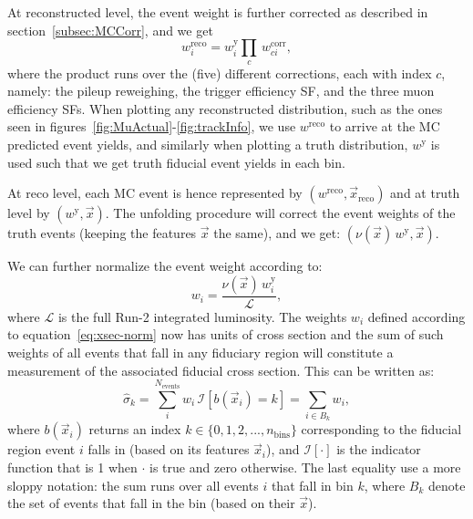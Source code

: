 At reconstructed level, the event weight is further corrected as described in section~\ref{subsec:MCCorr}, and we get
\begin{equation}
  \label{eq:mc-norm-reco}
  w^\mathrm{reco}_i = w^\mathrm{y}_i \prod_c\,w^\mathrm{corr}_{ci},
\end{equation} 
where the product runs over the (five) different corrections, each with index $c$, namely: the pileup reweighing, the trigger efficiency SF, and the three muon efficiency SFs. When plotting any reconstructed distribution, such as the ones seen in figures~\ref{fig:MuActual}-\ref{fig:trackInfo}, we use $w^\mathrm{reco}$ to arrive at the MC predicted event yields, and similarly when plotting a truth distribution, $w^\mathrm{y}$ is used such that we get truth fiducial event yields in each bin.


At reco level, each MC event is hence represented by $(w^\mathrm{reco},\vec{x}_\mathrm{reco})$ and at truth level by $(w^\mathrm{y},\vec{x})$.
The unfolding procedure will correct the event weights of the truth events (keeping the features $\vec{x}$ the same), and we get: $(\nu(\vec{x})\,w^\mathrm{y},\vec{x})$.


We can further normalize the event weight according to:
\begin{equation}
  \label{eq:xsec-norm}
  w_{i} = \frac{\nu(\vec{x})\,w^\mathrm{y}_{i}}{\mathcal{L}},
\end{equation}
where $\mathcal{L}$ is the full Run-2 integrated luminosity. The weights $w_i$ defined according to equation~\ref{eq:xsec-norm} now has units of cross section and the sum of such weights of all events that fall in any fiduciary region will constitute a measurement of the associated fiducial cross section. This can be written as:
\begin{equation}
  \label{eq:fid-xsec}
  \hat{\sigma}_{k} = \sum_{i}^{N_\mathrm{events}}w_{i}\,\mathcal{I}[b(\vec{x}_{i})=k] = \sum_{i\in B_k} w_i,
\end{equation}
where $b(\vec{x}_{i})$ returns an index $k\in\{0,1,2,...,n_\text{bins}\}$ corresponding to the fiducial region event $i$ falls in (based on its features $\vec{x}_i$), 
and $\mathcal{I}[\cdot]$ is the indicator function that is 1 when $\cdot$ is true and zero otherwise. The last equality use a more sloppy notation: the sum runs over all events $i$ that fall in bin $k$, where $B_k$ denote the set of events that fall in the bin (based on their $\vec{x}$). 
\clearpage


